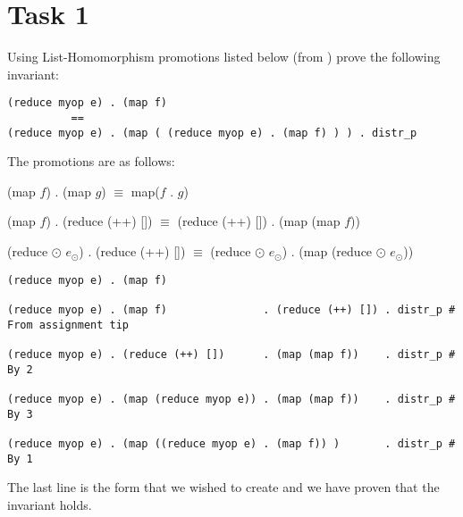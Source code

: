 \section{Task 1}
Using List-Homomorphism promotions listed below (from \cite[Slide 40]{l1intro})
prove the following invariant:
\begin{verbatim}
(reduce myop e) . (map f)
          ==
(reduce myop e) . (map ( (reduce myop e) . (map f) ) ) . distr_p
\end{verbatim}

\noindent The promotions are as follows:
\begin{enumerate*}
  \item (map $f$) . (map $g$) $\equiv$ map($f$ . $g$)
  \item (map $f$) . (reduce (++) []) $\equiv$ (reduce (++) []) . (map (map $f$))
  \item (reduce $\odot$ $e_\odot$) . (reduce (++) []) $\equiv$ (reduce $\odot$ $e_\odot$) . (map (reduce $\odot$ $e_\odot$))
\end{enumerate*}

\begin{verbatim}
(reduce myop e) . (map f)

(reduce myop e) . (map f)               . (reduce (++) []) . distr_p # From assignment tip

(reduce myop e) . (reduce (++) [])      . (map (map f))    . distr_p # By 2

(reduce myop e) . (map (reduce myop e)) . (map (map f))    . distr_p # By 3

(reduce myop e) . (map ((reduce myop e) . (map f)) )       . distr_p # By 1
\end{verbatim}

\noindent The last line is the form that we wished to create and we have proven
that the invariant holds.
